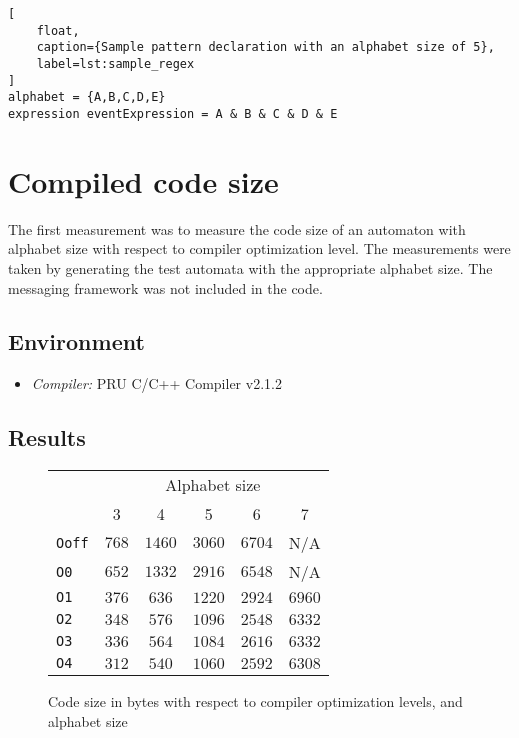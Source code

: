 \begin{lstlisting}[
	float,
	caption={Sample pattern declaration with an alphabet size of 5},
	label=lst:sample_regex
]
alphabet = {A,B,C,D,E}
expression eventExpression = A & B & C & D & E
\end{lstlisting}

\section{Compiled code size}

The first measurement was to measure the code size of an automaton with alphabet size with respect to compiler optimization level. The measurements were taken by generating the test automata with the appropriate alphabet size. The messaging framework was not included in the code.

\subsection{Environment}
\begin{itemize}
	\item \emph{Compiler:} PRU C/C++ Compiler v2.1.2
\end{itemize}

\subsection{Results}

\begin{figure}
	\centering
	\caption{Code size in bytes with respect to compiler optimization levels, and alphabet size}
	\begin{tabular}{l c c c c c}
		\toprule
		& \multicolumn{5}{c}{Alphabet size} \\
		\cmidrule(r){2-6}
		& 3 & 4 & 5 & 6 & 7 \\
		\midrule
		\texttt{Ooff} & $768$ &		$1460$ &	$3060$ & 	$6704$ & 	N/A \\
		\texttt{O0}   & $652$ &		$1332$ &	$2916$ & 	$6548$ & 	N/A \\
		\texttt{O1}   & $376$ &		$636$ &		$1220$ & 	$2924$ & 	$6960$ \\
		\texttt{O2}   & $348$ &		$576$ &		$1096$ & 	$2548$ & 	$6332$ \\
		\texttt{O3}   & $336$ &		$564$ &		$1084$ & 	$2616$ & 	$6332$ \\
		\texttt{O4}   & $312$ &		$540$ &		$1060$ & 	$2592$ & 	$6308$  \\
		\bottomrule
	\end{tabular}
	\label{fig:code_size_table}
\end{figure}

